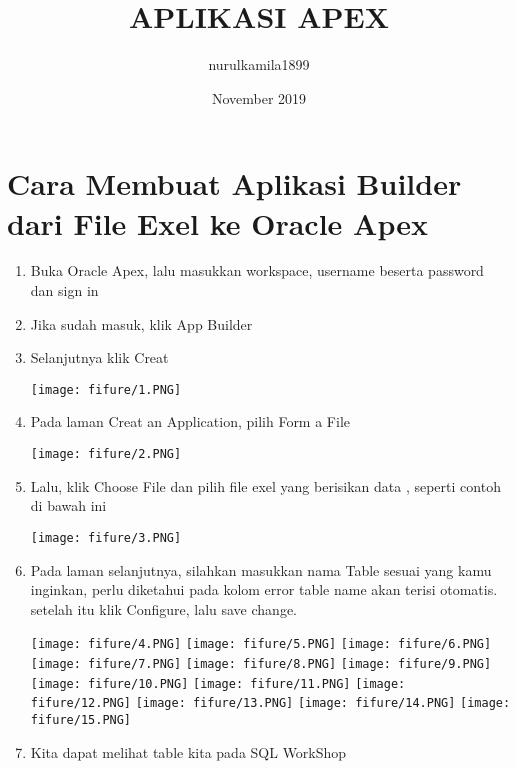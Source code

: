 \documentclass{article}
\title{APLIKASI APEX}
\author{nurulkamila1899 }
\date{November 2019}
\begin{document}
\maketitle

\section{Cara Membuat Aplikasi Builder dari File Exel ke Oracle Apex}
\begin{enumerate}
    \item Buka Oracle Apex, lalu masukkan workspace, username beserta password dan sign in
    \item Jika sudah masuk, klik App Builder
    \item Selanjutnya klik Creat
    \begin{center}
    \texttt{[image: fifure/1.PNG]}
    \end{center}
    \item Pada laman Creat an Application, pilih Form a File
     \begin{center}
    \texttt{[image: fifure/2.PNG]}
    \end{center}
    \item Lalu, klik Choose File dan pilih file exel yang berisikan data , seperti contoh di bawah ini
    \begin{center}
    \texttt{[image: fifure/3.PNG]}
    \end{center}
    \item Pada laman selanjutnya, silahkan masukkan nama Table sesuai yang kamu inginkan, perlu diketahui pada kolom error table name akan terisi otomatis. setelah itu klik Configure, lalu save change.
    \begin{center}
    \texttt{[image: fifure/4.PNG]}
    \texttt{[image: fifure/5.PNG]}
    \texttt{[image: fifure/6.PNG]}
    \texttt{[image: fifure/7.PNG]}
    \texttt{[image: fifure/8.PNG]}
    \texttt{[image: fifure/9.PNG]}
    \texttt{[image: fifure/10.PNG]}
    \texttt{[image: fifure/11.PNG]}
    \texttt{[image: fifure/12.PNG]}
    \texttt{[image: fifure/13.PNG]}
    \texttt{[image: fifure/14.PNG]}
    \texttt{[image: fifure/15.PNG]}
    \end{center}
    \item Kita dapat melihat table kita pada SQL WorkShop

\end{enumerate}
\end{document}
